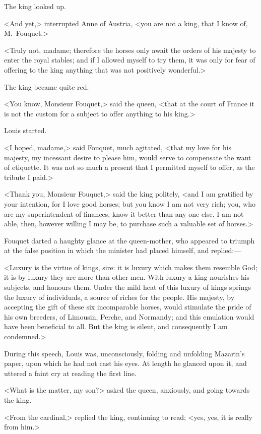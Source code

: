 The king looked up.

<And yet,> interrupted Anne of Austria, <you are not a king, that I know of, M.~Fouquet.>

<Truly not, madame; therefore the horses only await the orders of his majesty to enter the royal stables; and if I allowed myself to try them, it was only for fear of offering to the king anything that was not positively wonderful.>

The king became quite red.

<You know, Monsieur Fouquet,> said the queen, <that at the court of France it is not the custom for a subject to offer anything to his king.>

Louis started.

<I hoped, madame,> said Fouquet, much agitated, <that my love for his majesty, my incessant desire to please him, would serve to compensate the want of etiquette. It was not so much a present that I permitted myself to offer, as the tribute I paid.>

<Thank you, Monsieur Fouquet,> said the king politely, <and I am gratified by your intention, for I love good horses; but you know I am not very rich; you, who are my superintendent of finances, know it better than any one else. I am not able, then, however willing I may be, to purchase such a valuable set of horses.>

Fouquet darted a haughty glance at the queen-mother, who appeared to triumph at the false position in which the minister had placed himself, and replied:—

<Luxury is the virtue of kings, sire: it is luxury which makes them resemble God; it is by luxury they are more than other men. With luxury a king nourishes his subjects, and honours them. Under the mild heat of this luxury of kings springs the luxury of individuals, a source of riches for the people. His majesty, by accepting the gift of these six incomparable horses, would stimulate the pride of his own breeders, of Limousin, Perche, and Normandy; and this emulation would have been beneficial to all. But the king is silent, and consequently I am condemned.>

During this speech, Louis was, unconsciously, folding and unfolding Mazarin's paper, upon which he had not cast his eyes. At length he glanced upon it, and uttered a faint cry at reading the first line.

<What is the matter, my son?> asked the queen, anxiously, and going towards the king.

<From the cardinal,> replied the king, continuing to read; <yes, yes, it is really from him.>

